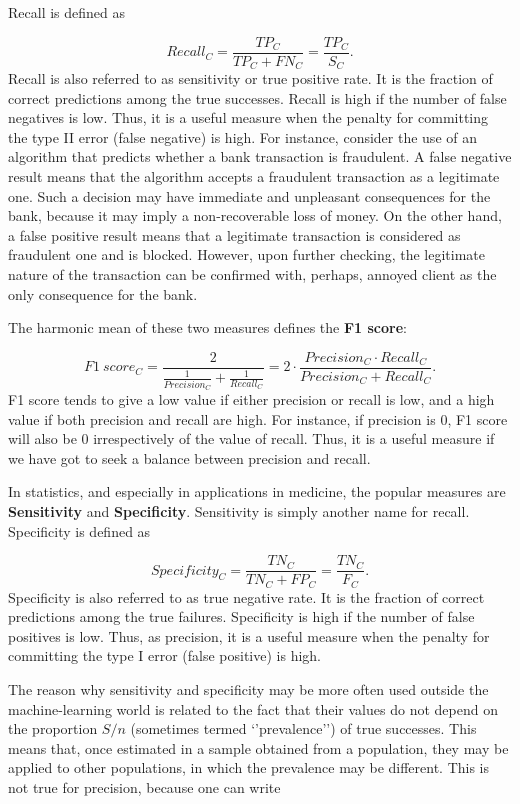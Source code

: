 \documentclass[]{krantz}
\begin{document}
Recall is defined as

\[
Recall_C = \frac{TP_C}{TP_C+FN_C} = \frac{TP_C}{S_C}.
\]
Recall is also referred to as sensitivity or true positive rate. It is the fraction of correct predictions among the true successes. Recall is high if the number of false negatives is low. Thus, it is a useful measure when the penalty for committing the type II error (false negative) is high. For instance, consider the use of an algorithm that predicts whether a bank transaction is fraudulent. A false negative result means that the algorithm accepts a fraudulent transaction as a legitimate one. Such a decision may have immediate and unpleasant consequences for the bank, because it may imply a non-recoverable loss of money. On the other hand, a false positive result means that a legitimate transaction is considered as fraudulent one and is blocked. However, upon further checking, the legitimate nature of the transaction can be confirmed with, perhaps, annoyed client as the only consequence for the bank.

The harmonic mean of these two measures defines the \textbf{F1 score}:

\[
F1\ score_C = \frac{2}{\frac{1}{Precision_C} + \frac{1}{Recall_C}} = 2\cdot\frac{Precision_C \cdot Recall_C}{Precision_C + Recall_C}.
\]
F1 score tends to give a low value if either precision or recall is low, and a high value if both precision and recall are high. For instance, if precision is 0, F1 score will also be 0 irrespectively of the value of recall. Thus, it is a useful measure if we have got to seek a balance between precision and recall.

In statistics, and especially in applications in medicine, the popular measures are \textbf{Sensitivity} and \textbf{Specificity}. Sensitivity is simply another name for recall. Specificity is defined as

\[
Specificity_C = \frac{TN_C}{TN_C + FP_C} = \frac{TN_C}{F_C}.
\]
Specificity is also referred to as true negative rate. It is the fraction of correct predictions among the true failures. Specificity is high if the number of false positives is low. Thus, as precision, it is a useful measure when the penalty for committing the type I error (false positive) is high.

The reason why sensitivity and specificity may be more often used outside the machine-learning world is related to the fact that their values do not depend on the proportion \(S/n\) (sometimes termed `'prevalence'') of true successes. This means that, once estimated in a sample obtained from a population, they may be applied to other populations, in which the prevalence may be different. This is not true for precision, because one can write
\end{document}
